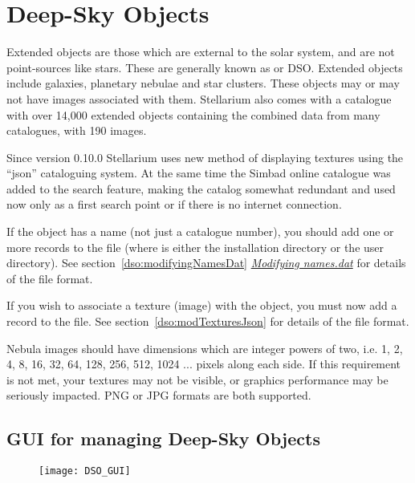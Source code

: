 
\chapter{Deep-Sky Objects}%
\label{ch:dso}

Extended objects are those which are external to the solar system, and
are not point-sources like stars. These are generally known as
 or DSO. Extended objects include
galaxies, planetary nebulae and star clusters. These objects may or
may not have images associated with them. Stellarium also comes with a
catalogue with over 14,000 extended objects containing the combined
data from many catalogues, with 190 images.

Since version 0.10.0 Stellarium uses new method of displaying
textures using the ``json'' cataloguing system. At the same time the
Simbad online catalogue was added to the search feature, making the catalog
somewhat redundant and used now only as a first search point or if there
is no internet connection.

If the object has a name (not just a catalogue number), you should add
one or more records to the  file
(where  is either the installation directory or the user
directory). See section~\ref{dso:modifyingNamesDat}
\emph{\protect\hyperlink{Modifyingux5fnames.dat}{Modifying names.dat}}
for details of the file format.

If you wish to associate a texture (image) with the object, you must now
add a record to the  file. See
section~\ref{dso:modTexturesJson} for details of the file format.

Nebula images should have dimensions which are integer powers of two,
i.e. 1, 2, 4, 8, 16, 32, 64, 128, 256, 512, 1024 ... pixels along each
side. If this requirement is not met, your textures may not be visible,
or graphics performance may be seriously impacted. PNG or JPG formats
are both supported.

\section{GUI for managing Deep-Sky Objects}%
\label{sec:dso:gui}

\begin{figure}[h]
\texttt{[image: DSO\_GUI]}
\end{figure}

